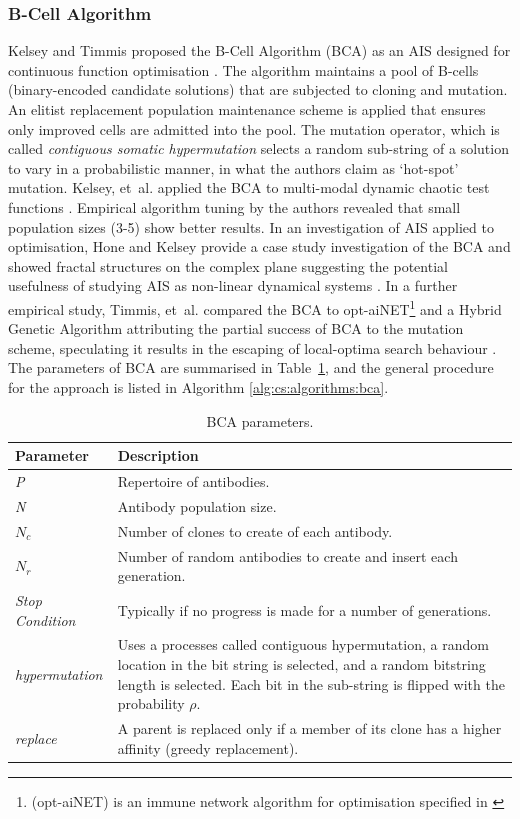 \subsubsection{B-Cell Algorithm}
\label{subsubsec:cs:taxonomy:bca}
Kelsey and Timmis proposed the B-Cell Algorithm (BCA) as an AIS designed for continuous function optimisation \cite{Kelsey2003}. The algorithm maintains a pool of B-cells (binary-encoded candidate solutions) that are subjected to cloning and mutation. An elitist replacement population maintenance scheme is applied that ensures only improved cells are admitted into the pool. The mutation operator, which is called \emph{contiguous somatic hypermutation} selects a random sub-string of a solution to vary in a probabilistic manner, in what the authors claim as `hot-spot' mutation. Kelsey, et~al. applied the BCA to multi-modal dynamic chaotic test functions \cite{Kelsey2003a}. Empirical algorithm tuning by the authors revealed that small population sizes (3-5) show better results. In an investigation of AIS applied to optimisation, Hone and Kelsey provide a case study investigation of the BCA and showed fractal structures on the complex plane suggesting the potential usefulness of studying AIS as non-linear dynamical systems \cite{Hone2004}. In a further empirical study, Timmis, et~al. compared the BCA to opt-aiNET\footnote{(opt-aiNET) is an immune network algorithm for optimisation specified in \cite{Castro2002c}} and a Hybrid Genetic Algorithm attributing the partial success of BCA to the mutation scheme, speculating it results in the escaping of local-optima search behaviour \cite{Timmis2004a}. The parameters of BCA are summarised in Table~\ref{tab:cs:algorithms:bcaparameters}, and the general procedure for the approach is listed in Algorithm \ref{alg:cs:algorithms:bca}.

\begin{table}[ht]
	\centering\small
		\begin{tabularx}{\textwidth}{lX}
		\toprule
		\textbf{Parameter} & \textbf{Description} \\ 
		\toprule
		\emph{P} & Repertoire of antibodies. \\ 
		\midrule
		\emph{N} & Antibody population size. \\ 
		\midrule
		$N_c$ & Number of clones to create of each antibody. \\ 
		\midrule
		$N_r$ & Number of random antibodies to create and insert each generation. \\ 
		\midrule
		\emph{Stop Condition} & Typically if no progress is made for a number of generations. \\ 
		\midrule
		\emph{hypermutation} & Uses a processes called contiguous hypermutation, a random location in the bit string is selected, and a random bitstring length is selected. Each bit in the sub-string is flipped with the probability $\rho$. \\ 
		\midrule
		\emph{replace} & A parent is replaced only if a member of its clone has a higher affinity (greedy replacement). \\ 
		\bottomrule
		\end{tabularx}
	\caption{BCA parameters.}
	\label{tab:cs:algorithms:bcaparameters}
\end{table}


